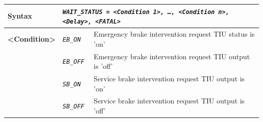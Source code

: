 \begin{itemize}
\begin{longtable}{|l|l|l|}
				\begin{minipage}[t]{0.22\linewidth} \textbf{Syntax}	\end{minipage}
			&	\multicolumn{2}{l|}{ \begin{minipage}[t]{0.78\linewidth} \emph{\texttt{WAIT\_STATUS = <Condition 1>, …, <Condition n>, <Delay>, <FATAL>}} \end{minipage} } \\

			\hline

				\multirow{1}{*}{ \begin{minipage}[t]{0.22\linewidth} \textbf{<Condition>} \end{minipage} }
			&	\begin{minipage}[t]{0.40\linewidth} \emph{\texttt{EB\_ON}} \end{minipage}
			&	\begin{minipage}[t]{0.38\linewidth} Emergency brake intervention request TIU status is ’on’ \end{minipage} \\

			\hline

			&	\begin{minipage}[t]{0.40\linewidth} \emph{\texttt{EB\_OFF}} \end{minipage}
			&	\begin{minipage}[t]{0.38\linewidth} Emergency brake intervention request TIU output is ’off’ \end{minipage} \\

			\hline

			&	\begin{minipage}[t]{0.40\linewidth} \emph{\texttt{SB\_ON}} \end{minipage}
			&	\begin{minipage}[t]{0.38\linewidth} Service brake intervention request TIU output is ’on’ \end{minipage} \\

			\hline

			&	\begin{minipage}[t]{0.40\linewidth} \emph{\texttt{SB\_OFF}} \end{minipage}
			&	\begin{minipage}[t]{0.38\linewidth} Service brake intervention request TIU output is ’off’ \end{minipage} \\

			\hline


\end{longtable}
\end{itemize}
